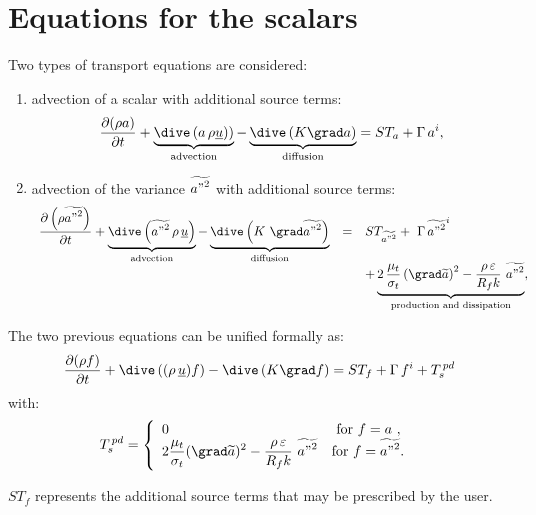 \section{Equations for the scalars}

Two types of transport equations are considered: 
%
\begin{enumerate}[ label=\roman{*}/, ref=(\roman{*})]
\item advection of a scalar with additional source terms:
\begin{equation}
\frac{\partial (\rho a)}{\partial t} +
\underbrace{
\dive \left( a \, \rho \underline{u})
\right)
}_{\text{advection}}
-\underbrace{
\dive \left( K\grad a \right) 
}_{
\text{diffusion}} = ST_{a}+\Gamma \,a^{i},
\end{equation}%

\item advection of the variance $\widetilde{{a"}^{2}}$ with
additional source terms:
\begin{equation}
\begin{array}{rcl}
\displaystyle\frac{\partial \left(\rho \widetilde{{a"}^{2}}\right)}{\partial t}+%
\underbrace{
\dive \left( \widetilde{{a"}^{2}} \, \rho \,\underline{u} \right)
}_{\text{advection}}
-\underbrace{
\dive \left( K\ \grad\widetilde{{a"}^{2}} \right)
}_{\text{diffusion}}
&=&ST_{\widetilde{{a"}^{2}}}+ \ \Gamma \, \widetilde{{a"}^{2}}^{i} 
\\
& &\displaystyle +
\underbrace{
2\,\frac{\mu _{t}}{\sigma _{t}} \left( \grad\widetilde{a} \right)^{2}-
\frac{\rho \,\varepsilon }{R_{f}k}\ \widetilde{{a"}^{2}}
}_{\text{production and dissipation}} ,
\end{array}%
\end{equation}%
\end{enumerate}


The two previous equations can be unified formally as:
\begin{equation}\label{eq:base_introd_depart}%
\frac{\partial (\rho f)}{\partial t}+\dive\,((\rho \,\underline{u})f)-\dive%
\,(K\grad f)=ST_{f}+\Gamma \,f^{i}+T_{s}^{\,pd}  
\end{equation}%
with:
\begin{equation}
\displaystyle T_{s}^{\,pd} = 
\left\{
\begin{array}{ll}
 0 & \text{ for $f=a$ }, \\
 2 \displaystyle \frac{\mu_t}{\sigma_t}(\grad \widetilde{a})^2 - \displaystyle
\frac{\rho\,\varepsilon}{R_f k}\ \widetilde{{a"}^2} & \text{for
$f=\widetilde{{a"}^2}$. }
\end{array}%
\right.
\end{equation}

$ST_f$ represents the additional source terms that may be prescribed by the
user.

